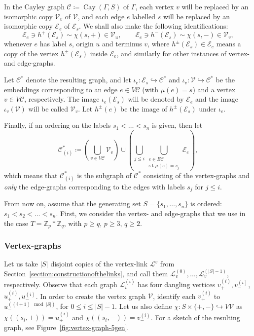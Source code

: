 \documentclass[ALCO,ThmDefs,Unicode,epreuves]{cedram}
\newcommand{\cC}{\mathcal{C}}
\newcommand{\cL}{\mathcal{L}}
\newcommand{\cV}{\mathcal{V}}
\newcommand{\cE}{\mathcal{E}}
\DeclareMathOperator{\Cay}{Cay}
\begin{document}
In the Cayley graph $\cC \coloneqq \Cay({\Gamma},S)$ of ${\Gamma}$, each vertex $v$ will be replaced by an isomorphic copy $\cV_v$ of $\cV$, and each edge $e$ labelled $s$ will be replaced by an isomorphic copy $\cE_e$ of $\cE_s$. We shall also make the following identifications:
 \[
 \cE_e \ni h^{+}(\cE_s) \sim {\chi}(s,+) \in \cV_u, \qquad \cE_e \ni h^{-}(\cE_s) \sim {\chi}(s,-) \in \cV_v,
 \]
whenever $e$ has label $s$, origin $u$ and terminus $v$, where $h^{\pm}(\cE_s) \in \cE_e$ means a copy of the vertex $h^{\pm}(\cE_s)$ inside $\cE_e$, and similarly for other instances of vertex- and edge-graphs. 

Let $\cC^*$ denote the resulting graph, and let ${\iota}_e:\cE_s {\hookrightarrow} \cC^*$ and ${\iota}_v:\cV {\hookrightarrow} \cC^*$ be the embeddings corresponding to an edge $e \in V\cC$ (with $\mu(e) = s$) and a vertex $v\in V\cC$, respectively. The image ${\iota}_e(\cE_s)$ will be denoted by $\cE_e$ and the image ${\iota}_v(\cV)$ will be called $\cV_v$. Let $h^{\pm}(e)$ be the image of $h^{\pm}(\cE_s)$ under ${\iota}_e$.

Finally, if an ordering on the labels $s_{1} < \dots < s_n$ is given, then let 
\[
 \cC^*_{(i)} \coloneqq \left(\bigcup_{v\in V\cC} \cV_v \right) \cup \left(\bigcup_{j\leq i} \bigcup_{\substack{e\in E\cC\ \\ \text{s.t.} {\mu}(e)=s_j}} \cE_e \right),
\]
which means that $\cC^*_{(i)}$ is the subgraph of $\cC^*$ consisting of the vertex-graphs and \emph{only} the edge-graphs corresponding to the edges with labels $s_j$ for $j\leq i$.

From now on, assume that the generating set $S = \{s_{1}, \dots, s_n\}$ is ordered: $s_1 < s_2 < \dots < s_n$. First, we consider the vertex- and edge-graphs that we use in the case $T = \mathbb{Z}_p*\mathbb{Z}_q$, with $p \geq q$, $p\geq 3$, $q\geq 2$. 


\subsubsection*{Vertex-graphs} 
Let us take $|S|$ disjoint copies of the vertex-link $\cL^{v}$ from Section~\ref{section:constructionofthelinks}, and call them $\cL_v ^{(0)}, \dots, \cL_v ^{(|S|-1)}$, respectively. Observe that each graph $\cL_v ^{(i)}$ has four dangling vertices $v^{(i)}_+,v^{(i)}_-$, $u^{(i)}_+,u^{(i)}_-$. In order to create the vertex graph $\cV$, identify each $v^{(i)}_+$ to $u^{((i+1) \mod |S|)}_-$, for $0\leq i\leq |S|-1$. Let us also define $\chi : S{\times}\{+,-\} \hookrightarrow V\cV$ as $\chi((s_i,+))=u_+^{(i)}$ and $\chi((s_i,-))=v_-^{(i)}$. For a sketch of the resulting graph, see Figure~\ref{fig:vertex-graph-5gen}. 
 
\end{document}
